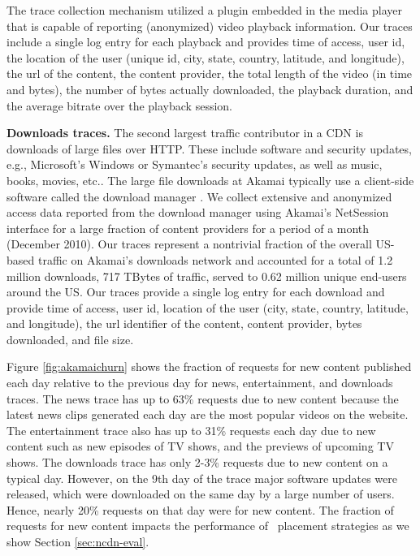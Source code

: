 

The trace collection mechanism utilized a plugin embedded in the media player that is capable of reporting (anonymized) video playback information. Our traces include a single log entry for each  playback and provides time of access, user id, the location of the user (unique id, city, state, country, latitude, and longitude), the url of the content, the content provider, the total length of the video (in time and bytes), the number of bytes actually downloaded, the playback duration, and the average bitrate over the playback session. 


{\bf Downloads traces.} The second largest traffic contributor in a CDN is  downloads of large files over HTTP. These include software and security updates,  e.g., Microsoft's Windows or Symantec's security updates, as well as music, books, movies, etc.. The large file downloads at Akamai typically use a client-side software called the download manager \cite{akamai-overview}. We collect extensive and  anonymized access data reported from the download manager using Akamai's NetSession interface \cite{netsessions} for a large fraction of content providers for a period of a month (December 2010). Our traces represent a nontrivial fraction of the overall US-based traffic on Akamai's downloads network  and accounted for a total of 1.2 million downloads, 717 TBytes of traffic, served to 0.62 million unique end-users around the US. Our traces provide a single log entry for each download and provide time of access, user id, location of the user (city, state, country, latitude, and longitude), the url identifier of the content, content provider, bytes downloaded, and file size.  

Figure \ref{fig:akamaichurn} shows the fraction of requests for new content published each day relative to the previous day for news, entertainment, and downloads traces. The news trace has up to 63\% requests due to new content because the latest news clips generated each day are the most popular videos on the website. The entertainment trace also has up to 31\% requests each day due to new content such as  new episodes of TV shows, and the previews of upcoming TV shows. The downloads trace has only 2-3\% requests due to new content on a typical day. However, on the 9th day of the trace major software updates were released, which were downloaded on the same day by a large number of users. Hence, nearly 20\% requests on that day were for new content. The fraction of requests for new content impacts the performance of \planned\ placement strategies as we show Section \ref{sec:ncdn-eval}.

